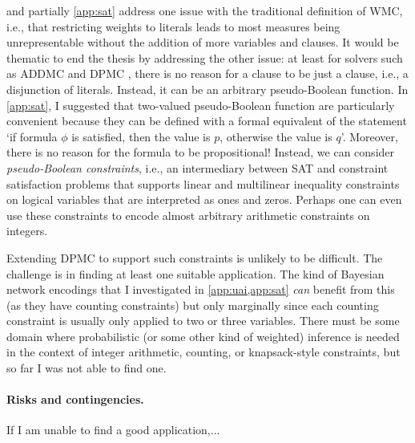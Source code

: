 \documentclass{article}
\begin{document}
 and partially \cref{app:sat} address one issue with the
traditional definition of WMC, i.e., that restricting weights to literals leads
to most measures being unrepresentable without the addition of more variables
and clauses. It would be thematic to end the thesis by addressing the other
issue: at least for solvers such as ADDMC \cite{DBLP:conf/aaai/DudekPV20} and
DPMC \cite{DBLP:conf/cp/DudekPV20}, there is no reason for a clause to be just a
clause, i.e., a disjunction of literals. Instead, it can be an arbitrary
pseudo-Boolean function. In \cref{app:sat}, I suggested that two-valued
pseudo-Boolean function are particularly convenient because they can be defined
with a formal equivalent of the statement `if formula $\phi$ is satisfied, then
the value is $p$, otherwise the value is $q$'. Moreover, there is no reason for
the formula to be propositional! Instead, we can consider \emph{pseudo-Boolean
  constraints}, i.e., an intermediary between SAT and constraint satisfaction
problems that supports linear and multilinear inequality constraints on logical
variables that are interpreted as ones and zeros. Perhaps one can even use these
constraints to encode almost arbitrary arithmetic constraints on integers.

Extending DPMC to support such constraints is unlikely to be difficult. The
challenge is in finding at least one suitable application. The kind of Bayesian
network encodings that I investigated in \cref{app:uai,app:sat} \emph{can}
benefit from this (as they have counting constraints) but only marginally since
each counting constraint is usually only applied to two or three variables.
There must be some domain where probabilistic (or some other kind of weighted)
inference is needed in the context of integer arithmetic, counting, or
knapsack-style constraints, but so far I was not able to find one.

\paragraph{Risks and contingencies.} If I am unable to find a good
application,...



\end{document}
